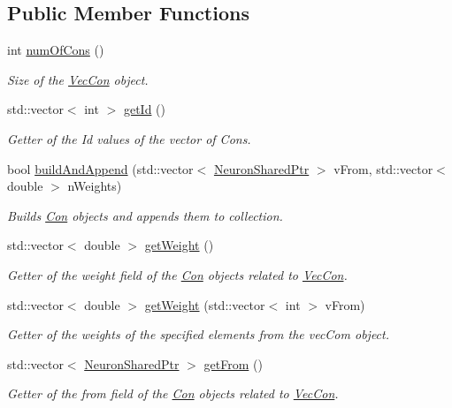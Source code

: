 \subsection*{Public Member Functions}
\begin{DoxyCompactItemize}
\item 
int \hyperlink{classvec_con_a1e39a5e78c40ae8af9bbd2fd7f0dc749}{numOfCons} ()
\begin{DoxyCompactList}\small\item\em Size of the \hyperlink{classvec_con}{VecCon} object. \end{DoxyCompactList}\item 
std::vector$<$ int $>$ \hyperlink{classvec_con_aa9f3f5df4c4060951c975c4c829b8471}{getId} ()
\begin{DoxyCompactList}\small\item\em Getter of the Id values of the vector of Cons. \end{DoxyCompactList}\item 
bool \hyperlink{classvec_con_ae2f2979a6ce42fa5ff0a8911a3ec3cb6}{buildAndAppend} (std::vector$<$ \hyperlink{_a_m_o_r_e_8h_a03051950b0faf9499d14cf376e04c329}{NeuronSharedPtr} $>$ vFrom, std::vector$<$ double $>$ nWeights)
\begin{DoxyCompactList}\small\item\em Builds \hyperlink{class_con}{Con} objects and appends them to collection. \end{DoxyCompactList}\item 
std::vector$<$ double $>$ \hyperlink{classvec_con_a76f10669494f2247d036ae6a1f296873}{getWeight} ()
\begin{DoxyCompactList}\small\item\em Getter of the weight field of the \hyperlink{class_con}{Con} objects related to \hyperlink{classvec_con}{VecCon}. \end{DoxyCompactList}\item 
std::vector$<$ double $>$ \hyperlink{classvec_con_ac3d4b7b11bfff3407afd585c1ae6a658}{getWeight} (std::vector$<$ int $>$ vFrom)
\begin{DoxyCompactList}\small\item\em Getter of the weights of the specified elements from the vecCom object. \end{DoxyCompactList}\item 
std::vector$<$ \hyperlink{_a_m_o_r_e_8h_a03051950b0faf9499d14cf376e04c329}{NeuronSharedPtr} $>$ \hyperlink{classvec_con_ae72d00aedcd054e690f1dcf2ca5ac2c2}{getFrom} ()
\begin{DoxyCompactList}\small\item\em Getter of the from field of the \hyperlink{class_con}{Con} objects related to \hyperlink{classvec_con}{VecCon}. \end{DoxyCompactList}\item 

\end{DoxyCompactItemize}
